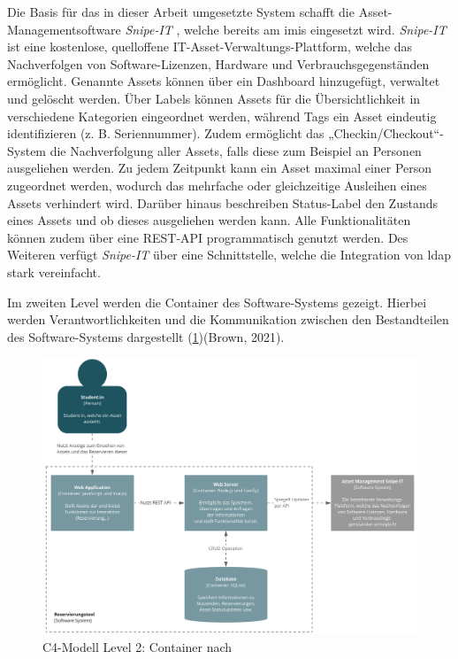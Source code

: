 Die Basis für das in dieser Arbeit umgesetzte System schafft die Asset-Managementsoftware
\textit{Snipe-IT} \cite{noauthor_home_nodate}, welche bereits am \ac{imis} eingesetzt wird.
\textit{Snipe-IT} ist eine kostenlose, quelloffene IT-Asset-Verwaltungs-Plattform, welche das
Nachverfolgen von Software-Lizenzen, Hardware und Verbrauchsgegenständen ermöglicht. Genannte Assets
können über ein Dashboard hinzugefügt, verwaltet und gelöscht werden. Über Labels können Assets für
die Übersichtlichkeit in verschiedene Kategorien eingeordnet werden, während Tags ein Asset
eindeutig identifizieren (z. B. Seriennummer). Zudem ermöglicht das „Checkin/Checkout“-System die
Nachverfolgung aller Assets, falls diese zum Beispiel an Personen ausgeliehen werden. Zu jedem
Zeitpunkt kann ein Asset maximal einer Person zugeordnet werden, wodurch das mehrfache oder
gleichzeitige Ausleihen eines Assets verhindert wird. Darüber hinaus beschreiben Status-Label den
Zustands eines Assets und ob dieses ausgeliehen werden kann. Alle Funktionalitäten können zudem über
eine REST-API programmatisch genutzt werden. Des Weiteren verfügt \textit{Snipe-IT} über eine
Schnittstelle, welche die Integration von \ac{ldap} stark vereinfacht.

    {\sffamily\color{maincolor}{Level 2: Container}}
\label{subsec:level2}
Im zweiten Level werden die Container des Software-Systems gezeigt. Hierbei
werden Verantwortlichkeiten und die Kommunikation zwischen den Bestandteilen des
Software-Systems dargestellt (\ref{fig:level2})(Brown, 2021).

\begin{figure}[h]
    \centering
    \includegraphics[scale=0.47]{Bilder/C4_2.pdf}
    \caption[C4-Modell Level 2: Container]{C4-Modell Level 2: Container nach
        }
    \label{fig:level2}
\end{figure}

